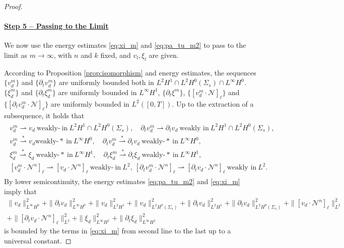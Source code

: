 \documentclass[letterpaper,reqno,10pt,twoside]{amsart}
\theoremstyle{definition}
\theoremstyle{remark}
\def\p{\partial}
\begin{document}
\begin{proof}
		\paragraph{\underline{Step 5 -- Passing to the Limit}}
		We now use the energy estimates \eqref{eq:xi_m} and \eqref{eq:pa_tu_m2} to pass to the limit as $m \to \infty$, with $n$ and $k$ fixed, and $v_{l},\xi_{l}$ are given.
		
		According to Proposition \ref{prop:isomorphism} and energy estimates, the sequences $\{v_{d}^m\}$ and $\{\p_tv_{d}^m\}$ are uniformly bounded both in $L^2H^1 \cap L^2H^0(\Sigma_s) \cap L^\infty H^0$. $\{\xi_{d}^m\}$ and $\{\p_t\xi_{d}^m\}$ are uniformly bounded in $L^\infty H^1$, $\{\p_t\xi^m\}$, $\{[v_{d}^m\cdot\mathcal{N}]_\ell\}$ and $\{[\p_tv_{d}^m\cdot\mathcal{N}]_\ell\}$ are uniformly bounded in $L^2([0,T])$.  Up to the extraction of a subsequence, it holds that
		\begin{align}\label{converge_1}
			\begin{aligned}
				v_{d}^m\rightharpoonup v_{d}\ \text{weakly-}\ \text{in}\ L^2 H^1\cap L^2H^0(\Sigma_s),\quad \p_tv_{d}^m\rightharpoonup\p_tv_{d}\ \text{weakly in}\ L^2H^1\cap L^2H^0(\Sigma_s),\\
				v_{d}^m\stackrel{\ast}\rightharpoonup v_{d} \text{weakly-}\ast\ \text{in}\ L^\infty H^0, \quad\p_t v_{d}^m\stackrel{\ast}\rightharpoonup \p_tv_{d}\ \text{weakly-}\ast\ \text{in}\ L^\infty H^0,\\
				\xi_{d}^m\stackrel{\ast}\rightharpoonup \xi_{d}\ \text{weakly-}\ast\ \text{in}\ L^\infty H^1, \quad\p_t\xi_{d}^m\stackrel{\ast}\rightharpoonup \p_t\xi_{d}\ \text{weakly-}\ast\ \text{in}\ L^\infty H^1,\\
				[v_{d}^m\cdot\mathcal{N}^{n}]_\ell\rightharpoonup[v_{d}\cdot\mathcal{N}^{n}]_\ell\ \text{weakly-}\ \text{in}\ L^2,\ [\p_tv_{d}^m\cdot\mathcal{N}^{n}]_\ell\rightharpoonup[\p_tv_{d}\cdot\mathcal{N}^{n}]_\ell\ \text{weakly in}\ L^2.
			\end{aligned}
		\end{align}
		By lower semicontinuity, the energy estimates \eqref{eq:pa_tu_m2} and \eqref{eq:xi_m} imply that
		\begin{equation}\label{eq:xi_m=}
			\begin{aligned}
				\|v_{d}\|_{L^\infty H^0}^2+\|\p_tv_{d}\|_{L^\infty H^0}^2+\|v_{d}\|_{L^2 H^1}^2+\|v_{d}\|_{L^2 H^0(\Sigma_s)}^2+\|\p_tv_{d}\|_{L^2H^1}^2+\|\p_tv_{d}\|_{L^2 H^0(\Sigma_s)}^2+\|[v_{d}\cdot\mathcal{N}^{n}]_\ell\|_{L^2}^2\\
				+\|[\p_tv_{d}\cdot\mathcal{N}^{n}]_\ell\|_{L^2}^2+\|\xi_{d}\|_{L^\infty H^1}^2+\|\p_t\xi_{d}\|_{L^\infty H^1}^2
			\end{aligned}
		\end{equation}
		is bounded by the terms in \eqref{eq:xi_m} from second line to the last up to a universal constant.
		

\end{proof}
\end{document}
